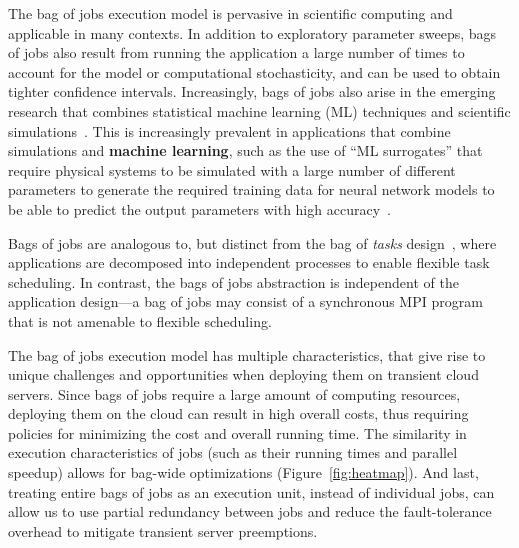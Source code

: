 The bag of jobs execution model is pervasive in scientific computing and applicable in many contexts.
In addition to exploratory parameter sweeps, bags of jobs also result from running the application a large number of times to account for the model or computational stochasticity, and can be used to obtain tighter confidence intervals. 
Increasingly, bags of jobs also arise in the emerging research that combines statistical machine learning (ML) techniques and scientific simulations~\cite{ml.atomic2017,melko2017,sam2017}. %
This is increasingly prevalent in applications that combine simulations and \textbf{machine learning}, such as the use of ``ML surrogates'' that require physical systems to be simulated with a large number of different parameters to generate the required training data for neural network models to be able to predict the output parameters with high accuracy~\cite{kadupitiya2020machine2}. 



Bags of jobs are analogous to, but distinct from the bag of \emph{tasks} design~\cite{bot-2003}, where applications are decomposed into independent processes to enable flexible task scheduling. 
In contrast, the bags of jobs abstraction is independent of the application design---a bag of jobs may consist of a synchronous MPI program that is not amenable to flexible scheduling. 




The bag of jobs execution model has multiple characteristics, that give rise to unique challenges and opportunities when deploying them on transient cloud servers. 
Since bags of jobs require a large amount of computing resources, deploying them on the cloud can result in high overall costs, thus requiring policies for minimizing the cost and overall running time. 
The similarity in execution characteristics of jobs (such as their running times and parallel speedup) allows for bag-wide optimizations (Figure~\ref{fig:heatmap}). 
And last, treating entire bags of jobs as an execution unit, instead of individual jobs, can allow us to use partial redundancy between jobs and reduce the fault-tolerance overhead to mitigate transient server preemptions. 



